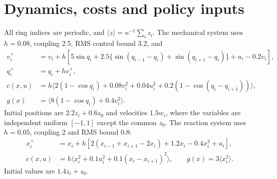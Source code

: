 \section{Dynamics, costs and policy inputs}\label{app:dynamics}
All ring indices are periodic, and $\langle z\rangle=n^{-1}\sum_i z_i$. The
mechanical system uses $h=0.08$, coupling 2.5, RMS control bound 3.2, and
\begin{align}
 v_i^+&=v_i+h[5\sin q_i+2.5\{\sin(q_{i-1}-q_i)+\sin(q_{i+1}-q_i)\}+u_i-0.2v_i],\\
 q_i^+&=q_i+hv_i^+,\\
 c(x,u)&=h\langle2(1-\cos q_i)+0.08v_i^2+0.04u_i^2+0.2(1-\cos(q_i-q_{i+1}))\rangle,\\
 g(x)&=\langle8(1-\cos q_i)+0.4v_i^2\rangle.
\end{align}
Initial positions are $2.2z_i+0.6z_0$ and velocities $1.5w_i$, where the
variables are independent uniform $[-1,1]$ except the common $z_0$.
The reaction system uses $h=0.05$, coupling 2 and RMS bound 0.8:
\begin{align}
 x_i^+&=x_i+h[2(x_{i-1}+x_{i+1}-2x_i)+1.2x_i-0.4x_i^3+u_i],\\
 c(x,u)&=h\langle x_i^2+0.1u_i^2+0.1(x_i-x_{i+1})^2\rangle,
 \qquad g(x)=3\langle x_i^2\rangle.
\end{align}
Initial values are $1.4z_i+z_0$.
